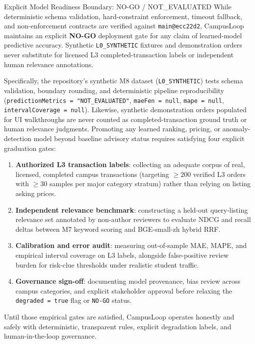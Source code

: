 \begin{clgate}{Explicit Model Readiness Boundary: NO-GO / NOT\_EVALUATED}
  \small
  While deterministic schema validation, hard-constraint enforcement, timeout fallback, and non-enforcement contracts are verified against \texttt{main@ecc22d2}, CampusLoop maintains an explicit \textbf{NO-GO} deployment gate for any claim of learned-model predictive accuracy. Synthetic \texttt{L0\_SYNTHETIC} fixtures and demonstration orders never substitute for licensed L3 completed-transaction labels or independent human relevance annotations.
\end{clgate}

Specifically, the repository's synthetic M8 dataset (\texttt{L0\_SYNTHETIC}) tests schema validation, boundary rounding, and deterministic pipeline reproducibility (\texttt{predictionMetrics = "NOT\_EVALUATED"}, \texttt{maeFen = null}, \texttt{mape = null}, \texttt{intervalCoverage = null}). Likewise, synthetic demonstration orders populated for UI walkthroughs are never counted as completed-transaction ground truth or human relevance judgments. Promoting any learned ranking, pricing, or anomaly-detection model beyond baseline advisory status requires satisfying four explicit graduation gates:
\begin{enumerate}
  \item \textbf{Authorized L3 transaction labels}: collecting an adequate corpus of real, licensed, completed campus transactions (targeting $\ge 200$ verified L3 orders with $\ge 30$ samples per major category stratum) rather than relying on listing asking prices.
  \item \textbf{Independent relevance benchmark}: constructing a held-out query-listing relevance set annotated by non-author reviewers to evaluate NDCG and recall deltas between M7 keyword scoring and BGE-small-zh hybrid RRF.
  \item \textbf{Calibration and error audit}: measuring out-of-sample MAE, MAPE, and empirical interval coverage on L3 labels, alongside false-positive review burden for risk-clue thresholds under realistic student traffic.
  \item \textbf{Governance sign-off}: documenting model provenance, bias review across campus categories, and explicit stakeholder approval before relaxing the \texttt{degraded = true} flag or \texttt{NO-GO} status.
\end{enumerate}

Until those empirical gates are satisfied, CampusLoop operates honestly and safely with deterministic, transparent rules, explicit degradation labels, and human-in-the-loop governance.
